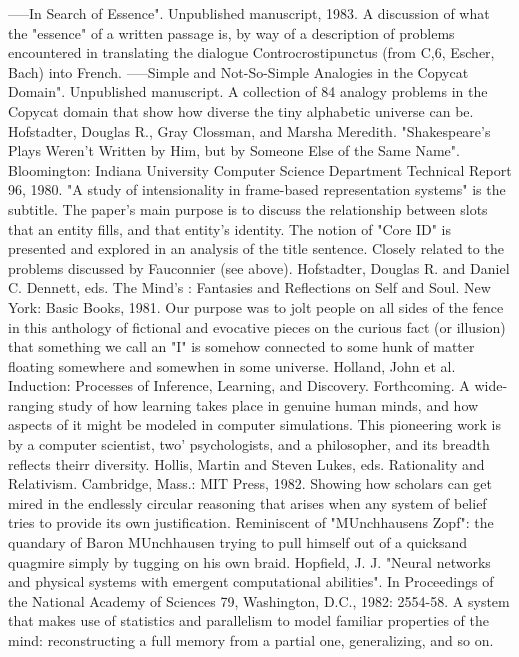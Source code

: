 -----In Search of Essence". Unpublished manuscript, 1983. A discussion of what the "essence"
  of a written passage is, by way of a description of problems encountered in translating the
  dialogue Controcrostipunctus (from C,6, Escher, Bach) into French.
-----Simple and Not-So-Simple Analogies in the Copycat Domain". Unpublished manuscript.
  A collection of 84 analogy problems in the Copycat domain that show how diverse the tiny
  alphabetic universe can be.
Hofstadter, Douglas R., Gray Clossman, and Marsha Meredith. "Shakespeare's Plays Weren't
  Written by Him, but by Someone Else of the Same Name". Bloomington: Indiana
  University Computer Science Department Technical Report 96, 1980. "A study of
  intensionality in frame-based representation systems" is the subtitle. The paper's main
  purpose is to discuss the relationship between slots that an entity fills, and that entity's
  identity. The notion of "Core ID" is presented and explored in an analysis of the title
  sentence. Closely related to the problems discussed by Fauconnier (see above).
Hofstadter, Douglas R. and Daniel C. Dennett, eds. The Mind's : Fantasies and Reflections on
  Self and Soul. New York: Basic Books, 1981. Our purpose was to jolt people on all sides of
  the fence in this anthology of fictional and evocative pieces on the curious fact (or illusion)
  that something we call an "I" is somehow connected to some hunk of matter floating
  somewhere and somewhen in some universe.
Holland, John et al. Induction: Processes of Inference, Learning, and Discovery. Forthcoming.
  A wide-ranging study of how learning takes place in genuine human minds, and how
  aspects of it might be modeled in computer simulations. This pioneering work is by a
  computer scientist, two' psychologists, and a philosopher, and its breadth reflects theirr
  diversity.
Hollis, Martin and Steven Lukes, eds. Rationality and Relativism. Cambridge, Mass.: MIT
  Press, 1982. Showing how scholars can get mired in the endlessly circular reasoning that
  arises when any system of belief tries to provide its own justification. Reminiscent of
  "MUnchhausens Zopf": the quandary of Baron MUnchhausen trying to pull himself out of a
  quicksand quagmire simply by tugging on his own braid.
Hopfield, J. J. "Neural networks and physical systems with emergent computational abilities".
  In Proceedings of the National Academy of Sciences 79, Washington, D.C., 1982: 2554-58.
  A system that makes use of statistics and parallelism to model familiar properties of the
  mind: reconstructing a full memory from a partial one, generalizing, and so on.
